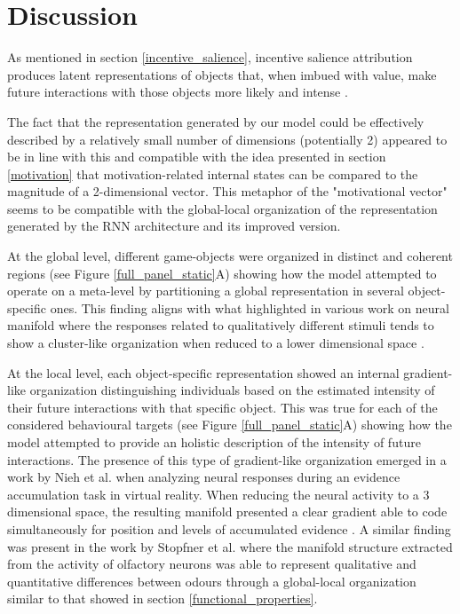 \section{Discussion}
As mentioned in section  \ref{incentive_salience}, incentive salience attribution produces latent representations of objects that, when imbued with value, make future interactions with those objects more likely and intense \cite{berridge1998role,berridge2004motivation}. 

The fact that the representation generated by our model could be effectively described by a relatively small number of dimensions (potentially 2) appeared to be in line with this and compatible with the idea presented in section \ref{motivation} that motivation-related internal states can be compared to the magnitude of a 2-dimensional vector. This metaphor of the "motivational vector" seems to be compatible with the global-local organization of the representation generated by the RNN architecture and its improved version. 

At the global level, different game-objects were organized in distinct and coherent regions (see Figure \ref{full_panel_static}A) showing how the model attempted to operate on a meta-level by partitioning a global representation in several object-specific ones. This finding aligns with what highlighted in various work on neural manifold where the responses related to qualitatively different stimuli tends to show a cluster-like organization when reduced to a lower dimensional space \cite{stopfer2003intensity, gallego2017neural, ganmor2015thesaurus}. 

At the local level, each object-specific representation showed an internal gradient-like organization distinguishing individuals based on the estimated intensity of their future interactions with that specific object. This was true for each of the considered behavioural targets (see Figure \ref{full_panel_static}A) showing how the model attempted to provide an holistic description of the intensity of future interactions. The presence of this type of gradient-like organization emerged in a work by Nieh et al. \cite{nieh2021geometry} when analyzing neural responses during an evidence accumulation task in virtual reality. When reducing the neural activity to a 3 dimensional space, the resulting manifold presented a clear gradient able to code simultaneously for position and levels of accumulated evidence \cite{nieh2021geometry}. A similar finding was present in the work by Stopfner et al. \cite{stopfer2003intensity} where the manifold structure extracted from the activity of olfactory neurons was able to represent qualitative and quantitative differences between odours through a global-local organization similar to that showed in section \ref{functional_properties}.


